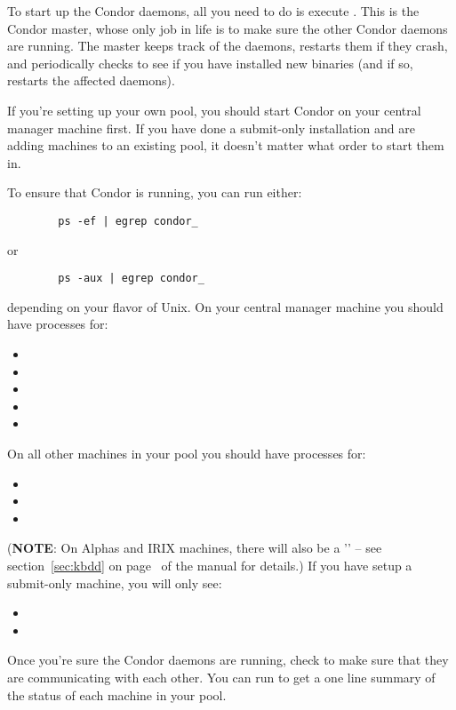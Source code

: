 To start up the Condor daemons, all you need to do is execute
.  This is the Condor master, whose
only job in life is to make sure the other Condor daemons are running.
The master keeps track of the daemons, restarts them if they crash,
and periodically checks to see if you have installed new binaries (and
if so, restarts the affected daemons).

If you're setting up your own pool, you should start Condor on your
central manager machine first.  If you have done a submit-only
installation and are adding machines to an existing pool, it doesn't
matter what order to start them in.

To ensure that Condor is running, you can run either:
\begin{verbatim}
        ps -ef | egrep condor_
\end{verbatim}
or
\begin{verbatim}
        ps -aux | egrep condor_
\end{verbatim}
depending on your flavor of Unix.  On your central manager machine you
should have processes for:
\begin{itemize}
	\item {}
	\item {}
	\item {}
	\item {}
	\item {}
\end{itemize}
On all other machines in your pool you should have processes for:
\begin{itemize}
	\item {}
	\item {}
	\item {}
\end{itemize}
(\textbf{NOTE}: On Alphas and IRIX machines, there will also be a
	'' -- see section~\ref{sec:kbdd} on
	page~\pageref{sec:kbdd} of the manual for details.)  If you
	have setup a submit-only machine, you will only see:
\begin{itemize}
	\item {}
	\item {}
\end{itemize}

Once you're sure the Condor daemons are running, check to make sure
that they are communicating with each other.  You can run
 to get a one line summary of the status of each
machine in your pool.


